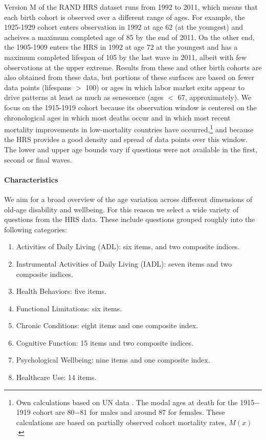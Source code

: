 \documentclass[11pt,oneside]{article} %
\begin{document}
Version M of the RAND HRS dataset runs from 1992 to 2011, which
means that each birth cohort is observed over a different range of ages. For
example, the 1925-1929 cohort enters observation in 1992 at age 62 (at the
youngest) and acheives a maximum completed age of 85 by the end of 2011. On the
other end, the 1905-1909 enters the HRS in 1992 at age 72 at the youngest and
has a maximum completed lifespan of 105 by the last wave in 2011, albeit with
few observations at the upper extreme. Results from these and other birth
cohorts are also obtained from these data, but portions of these surfaces are
based on fewer data points (lifespans $>$ 100) or ages in which labor market
exits appear to drive patterns at least as much as senescence (ages $<$ 67,
approximately). We focus on the 1915-1919 cohort because its observation window
is centered on the chronological ages in which most deaths occur and in which most recent mortality improvements in low-mortality countries have occurred,\footnote{Own calculations based on UN
data \citep{UN2012prospects}. The modal ages at death for the 1915$-$1919 cohort
are 80$-$81 for males and around 87 for females. These calculations are based on
partially observed cohort mortality rates, $M(x)$ \citep{HMD}.} and because
the HRS provides a good density and spread of data points over this window. The lower and upper age bounds vary if questions were not available in the first, second or final waves.

\paragraph*{Characteristics}
We aim for a broad overview of the age variation across different dimensions of
old-age disability and wellbeing. For this reason we select a wide variety of
questions from the HRS data. These include questions
grouped roughly into the following categories: 

\begin{enumerate}
  \item Activities of Daily Living (ADL): six items, and two composite indices.
  \item Instrumental Activities of Daily Living (IADL): seven items and two
  composite indices.
  \item Health Behaviors: five items.
  \item Functional Limitations: six items.
  \item Chronic Conditions: eight items and one composite index.
  \item Cognitive Function: 15 items and two composite indices.
  \item Psychological Wellbeing: nine items and one composite index.
  \item Healthcare Use: 14 items.
\end{enumerate}
\end{document}
